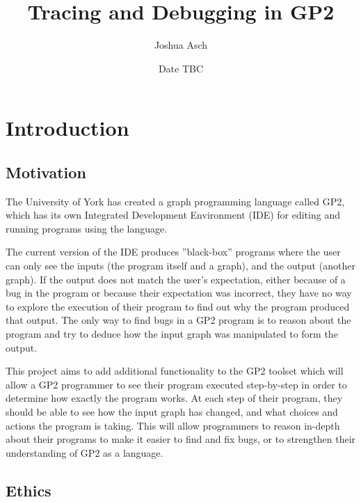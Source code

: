 \documentclass[authoryearcitations]{UoYCSproject}
\author{Joshua Asch}
\title{Tracing and Debugging in GP2}
\date{Date TBC}
\begin{document}
\maketitle
\listoffigures
\listoftables

\cleardoublepage


\chapter{Introduction}
\label{cha:Introduction}

\section{Motivation}
\label{sec:Motivation}

The University of York has created a graph programming language called GP2,
which has its own Integrated Development Environment (IDE) for editing and
running programs using the language.

The current version of the IDE produces ''black-box'' programs where the user
can only see the inputs (the program itself and a graph), and the output (another
graph). If the output does not match the user's expectation, either because of
a bug in the program or because their expectation was incorrect, they have no
way to explore the execution of their program to find out why the program
produced that output. The only way to find bugs in a GP2 program is to reason
about the program and try to deduce how the input graph was manipulated to form
the output.

This project aims to add additional functionality to the GP2 toolset which will
allow a GP2 programmer to see their program executed step-by-step in order to
determine how exactly the program works. At each step of their program, they
should be able to see how the input graph has changed, and what choices and
actions the program is taking. This will allow programmers to reason in-depth
about their programs to make it easier to find and fix bugs, or to strengthen
their understanding of GP2 as a language.


\section{Ethics}
\label{sec:Ethics}
\end{document}
